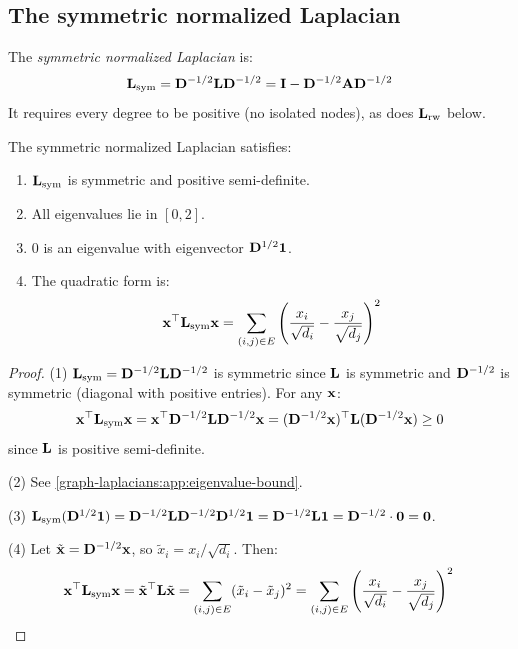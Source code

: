 \begin{notechapter}
\subsection{The symmetric normalized Laplacian}

\begin{definition}\label{graph-laplacians:def:sym-laplacian}
The \emph{symmetric normalized Laplacian} is:
\begin{equation}
\mathbf{L}_{\text{sym}} = \mathbf{D}^{-1/2} \mathbf{L} \mathbf{D}^{-1/2} = \mathbf{I} - \mathbf{D}^{-1/2} \mathbf{A} \mathbf{D}^{-1/2}
\label{graph-laplacians:eq:sym-laplacian}
\end{equation}
It requires every degree to be positive (no isolated nodes), as does $\mathbf{L}_{\text{rw}}$ below.
\end{definition}

\begin{theorem}\label{graph-laplacians:thm:sym-properties}
The symmetric normalized Laplacian satisfies:
\begin{enumerate}
    \item $\mathbf{L}_{\text{sym}}$ is symmetric and positive semi-definite.
    \item All eigenvalues lie in $[0, 2]$.
    \item $0$ is an eigenvalue with eigenvector $\mathbf{D}^{1/2} \mathbf{1}$.
    \item The quadratic form is:
    \begin{equation}
    \mathbf{x}^\top \mathbf{L}_{\text{sym}} \mathbf{x} = \sum_{(i,j) \in E} \left( \frac{x_i}{\sqrt{d_i}} - \frac{x_j}{\sqrt{d_j}} \right)^2
    \end{equation}
\end{enumerate}
\end{theorem}

\begin{proof}
(1) $\mathbf{L}_{\text{sym}} = \mathbf{D}^{-1/2} \mathbf{L} \mathbf{D}^{-1/2}$ is symmetric since $\mathbf{L}$ is symmetric and $\mathbf{D}^{-1/2}$ is symmetric (diagonal with positive entries). For any $\mathbf{x}$:
\[
\mathbf{x}^\top \mathbf{L}_{\text{sym}} \mathbf{x} = \mathbf{x}^\top \mathbf{D}^{-1/2} \mathbf{L} \mathbf{D}^{-1/2} \mathbf{x} = (\mathbf{D}^{-1/2}\mathbf{x})^\top \mathbf{L} (\mathbf{D}^{-1/2}\mathbf{x}) \geq 0
\]
since $\mathbf{L}$ is positive semi-definite.

(2) See \cref{graph-laplacians:app:eigenvalue-bound}.

(3) $\mathbf{L}_{\text{sym}} (\mathbf{D}^{1/2}\mathbf{1}) = \mathbf{D}^{-1/2} \mathbf{L} \mathbf{D}^{-1/2} \mathbf{D}^{1/2} \mathbf{1} = \mathbf{D}^{-1/2} \mathbf{L} \mathbf{1} = \mathbf{D}^{-1/2} \cdot \mathbf{0} = \mathbf{0}$.

(4) Let $\tilde{\mathbf{x}} = \mathbf{D}^{-1/2}\mathbf{x}$, so $\tilde{x}_i = x_i / \sqrt{d_i}$. Then:
\[
\mathbf{x}^\top \mathbf{L}_{\text{sym}} \mathbf{x} = \tilde{\mathbf{x}}^\top \mathbf{L} \tilde{\mathbf{x}} = \sum_{(i,j) \in E} (\tilde{x}_i - \tilde{x}_j)^2 = \sum_{(i,j) \in E} \left( \frac{x_i}{\sqrt{d_i}} - \frac{x_j}{\sqrt{d_j}} \right)^2 \qedhere
\]
\end{proof}


\end{notechapter}
